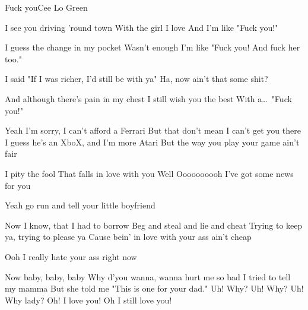 \begin{Song}{Fuck you}{Cee Lo Green}
\begin{multicols}{2}

\begin{Chorus}
I see you driving 'round town
With the girl I love
And I'm like "Fuck you!"
\espaceInterStrophe

I guess the change in my pocket
Wasn't enough
I'm like "Fuck you!
And fuck her too."
\espaceInterStrophe

I said "If I was richer,
I'd still be with ya"
Ha, now ain't that some shit?
\espaceInterStrophe

And although there's pain in my chest
I still wish you the best
With a\dots\ "Fuck you!"
\end{Chorus}
\espaceInterStrophe

\begin{Verse}
Yeah I'm sorry, I can't afford a Ferrari
But that don't mean I can't get you there
I guess he's an XboX, and I'm more Atari
But the way you play your game ain't fair
\end{Verse}
\espaceInterStrophe

\begin{PreChorus}
I pity the fool
That falls in love with you
Well
Oooooooooh
I've got some news for you
\espaceInterStrophe

Yeah go run and tell your little boyfriend
\end{PreChorus}
\espaceInterStrophe

\tochorus
\espaceInterStrophe

\begin{Verse}
Now I know, that I had to borrow
Beg and steal and lie and cheat
Trying to keep ya, trying to please ya
Cause bein' in love with your ass ain't cheap
\end{Verse}
\espaceInterStrophe

\espaceInterStrophe

Ooh I really hate your ass right now
\espaceInterStrophe

\tochorus
\espaceInterStrophe

\begin{Bridge}
Now baby, baby, baby
Why d'you wanna, wanna hurt me so bad
I tried to tell my mamma
But she told me "This is one for your dad."
Uh! Why? Uh! Why? Uh! Why lady?
Oh! I love you! Oh I still love you!
\end{Bridge}
\espaceInterStrophe


\end{multicols}
\end{Song}
